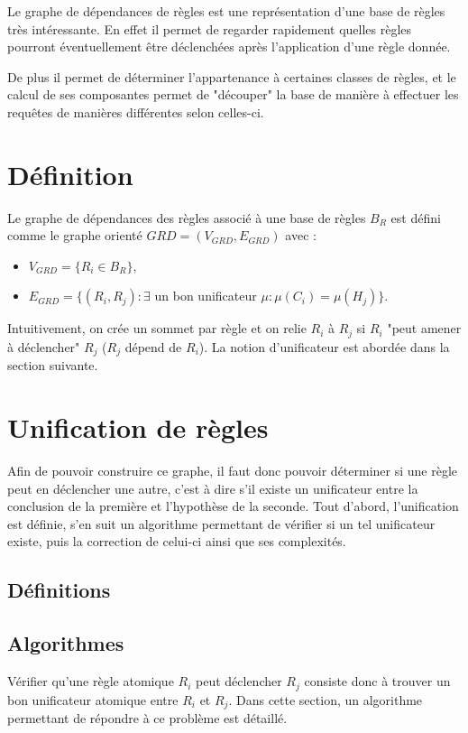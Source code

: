 
Le graphe de dépendances de règles est une représentation d'une base de règles très
intéressante. En effet il permet de regarder rapidement quelles règles pourront
éventuellement être déclenchées après l'application d'une règle donnée.

De plus il permet de déterminer l'appartenance à certaines classes de règles, et le
calcul de ses composantes permet de "découper" la base de manière à effectuer
les requêtes de manières différentes selon celles-ci. 


\section{Définition}\label{grd_def}
Le graphe de dépendances des règles associé à une base de règles $B_R$ est défini comme le 
graphe orienté $GRD = (V_{GRD},E_{GRD})$ avec :
\begin{itemize}
	\item $V_{GRD} = \{R_i \in B_R\}$,
	\item $E_{GRD} = \{(R_i,R_j) : \exists$ un bon unificateur $\mu : \mu(C_i) =
	\mu(H_j)\}$. 
\end{itemize}
Intuitivement, on crée un sommet par règle et on relie $R_i$ à $R_j$ si $R_i$ "peut
amener à déclencher" $R_j$ ($R_j$ dépend de $R_i$).
La notion d'unificateur est abordée dans la section suivante.



\section{Unification de règles}\label{grd_unif}

Afin de pouvoir construire ce graphe, il faut donc pouvoir déterminer si une règle peut
en déclencher une autre, c'est à dire s'il existe un unificateur entre la conclusion de
la première et l'hypothèse de la seconde.
Tout d'abord, l'unification est définie, s'en suit un algorithme permettant de vérifier
si un tel unificateur existe, puis la correction de celui-ci ainsi que ses complexités. 

\subsection{Définitions}\label{grd_unif_def}


\subsection{Algorithmes}\label{grd_algo}
	Vérifier qu'une règle atomique $R_i$ peut déclencher $R_j$ consiste donc à trouver un bon
	unificateur atomique entre $R_i$ et $R_j$. Dans cette section, un algorithme
	permettant de répondre à ce problème est détaillé.

